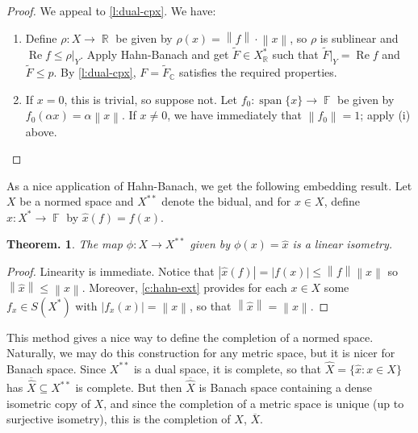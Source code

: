 \documentclass[11pt, a4paper]{memoir}
\DeclareMathOperator{\R}{{\mathbb{R}}}
\DeclareMathOperator{\C}{{\mathbb{C}}}
\DeclareMathOperator{\F}{{\mathbb{F}}}
\newcommand{\norm}[1]{\ensuremath{\left\lVert#1\right\rVert}}
\theoremstyle{change}
\newtheorem{theorem}{Theorem.}[section]
\theoremstyle{plain}
\theoremstyle{nonumberplain}
\newtheorem{proof}{Proof}
\DeclareMathOperator{\spn}{span}
\renewcommand{\Re}{\ensuremath{\operatorname{Re}}}
\numberwithin{equation}{section}
\begin{document}
\begin{proof}
    We appeal to \cref{l:dual-cpx}.
    We have:
    \begin{enumerate}[nl,r]
        \item Define $\rho:X\to\R$ be given by $\rho(x)=\norm{f}\cdot\norm{x}$, so $\rho$ is sublinear and $\Re f\leq \rho|_Y$.
            Apply Hahn-Banach and get $\tilde F\in X_{\R}^*$ such that $\tilde F|_Y=\Re f$ and $\tilde F\leq p$.
            By \cref{l:dual-cpx}, $F=\tilde F_{\C}$ satisfies the required properties.
        \item If $x=0$, this is trivial, so suppose not.
            Let $f_0:\spn\{x\}\to\F$ be given by $f_0(\alpha x)=\alpha\norm{x}$.
            If $x\neq 0$, we have immediately that $\norm{f_0}=1$; apply (i) above.
    \end{enumerate}
\end{proof}
As a nice application of Hahn-Banach, we get the following embedding result.
Let $X$ be a normed space and $X^{**}$ denote the bidual, and for $x\in X$, define $\hat{x}:X^*\to\F$ by $\hat{x}(f)=f(x)$.
\begin{theorem}
    The map $\phi:X\to X^{**}$ given by $\phi(x)=\hat{x}$ is a linear isometry.
\end{theorem}
\begin{proof}
    Linearity is immediate.
    Notice that $|\hat x(f)|=|f(x)|\leq\norm{f}\norm{x}$ so $\norm{\hat{x}}\leq\norm{x}$.
    Moreover, \cref{c:hahn-ext} provides for each $x\in X$ some $f_x\in S(X^*)$ with $|f_x(x)|=\norm{x}$, so that $\norm{\hat{x}}=\norm{x}$.
\end{proof}
This method gives a nice way to define the completion of a normed space.
Naturally, we may do this construction for any metric space, but it is nicer for Banach space.
Since $X^{**}$ is a dual space, it is complete, so that $\hat X=\{\hat x:x\in X\}$ has $\overline{\hat X}\subseteq X^{**}$ is complete.
But then $\overline{\hat{X}}$ is Banach space containing a dense isometric copy of $X$, and since the completion of a metric space is unique (up to surjective isometry), this is the completion of $X$, $\overline{X}$.
\end{document}
